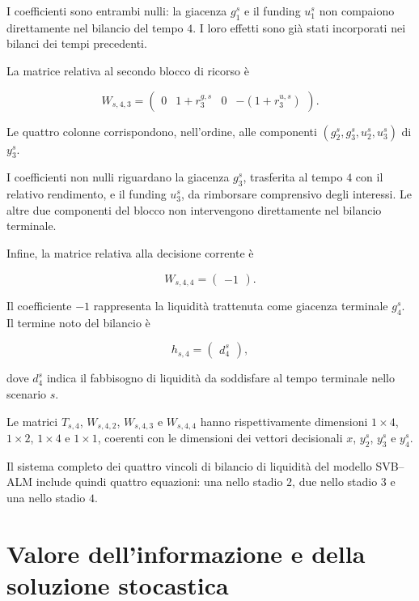 I coefficienti sono entrambi nulli:
la giacenza $g_1^s$ e il funding $u_1^s$
non compaiono direttamente nel bilancio
del tempo $4$. I loro effetti sono
gi\`a stati incorporati nei bilanci
dei tempi precedenti.

La matrice relativa al secondo blocco
di ricorso \`e

\[
W_{s,4,3}
=
\begin{pmatrix}
0&
1+r_3^{g,s}&
0&
-(1+r_3^{u,s})
\end{pmatrix}.
\]

Le quattro colonne corrispondono,
nell'ordine, alle componenti
$(g_2^s,g_3^s,u_2^s,u_3^s)$ di $y_3^s$.

I coefficienti non nulli riguardano
la giacenza $g_3^s$, trasferita
al tempo $4$ con il relativo rendimento,
e il funding $u_3^s$, da rimborsare
comprensivo degli interessi.
Le altre due componenti del blocco
non intervengono direttamente
nel bilancio terminale.

Infine, la matrice relativa alla
decisione corrente \`e

\[
W_{s,4,4}
=
\begin{pmatrix}
-1
\end{pmatrix}.
\]

Il coefficiente $-1$ rappresenta
la liquidit\`a trattenuta come
giacenza terminale $g_4^s$.
Il termine noto del bilancio \`e

\[
h_{s,4}
=
\begin{pmatrix}
d_4^s
\end{pmatrix},
\]

\noindent dove $d_4^s$ indica il fabbisogno
di liquidit\`a da soddisfare
al tempo terminale nello scenario $s$.

Le matrici $T_{s,4}$, $W_{s,4,2}$,
$W_{s,4,3}$ e $W_{s,4,4}$ hanno
rispettivamente dimensioni
$1\times4$, $1\times2$, $1\times4$
e $1\times1$, coerenti con
le dimensioni dei vettori decisionali
$x$, $y_2^s$, $y_3^s$ e $y_4^s$.

Il sistema completo
dei quattro vincoli di bilancio di liquidit\`a del modello SVB--ALM include quindi quattro equazioni: una nello stadio $2$,
due nello stadio $3$ e una nello stadio $4$.


\section{Valore dell'informazione e della soluzione stocastica}

\label{sec:cap15-valore-informazione-v2}

